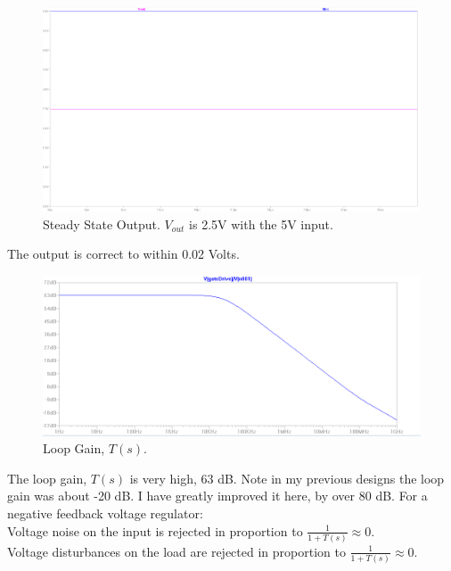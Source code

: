 \documentclass[10pt]{amsart}
\begin{document}
\begin{figure}[h]
	\begin{center}
		\includegraphics[width=7in]{Media/ss.png}
	\end{center}
	\caption{Steady State Output. $V_{out}$ is 2.5V with the 5V input.}
	\label{fig:pidfb}
\end{figure}

The output is correct to within 0.02 Volts.

\newpage

\begin{figure}[h]
	\begin{center}
		\includegraphics[width=7in]{Media/lg.png}
	\end{center}
	\caption{Loop Gain, $T(s)$.}
	\label{fig:pidfb}
\end{figure}

The loop gain, $T(s)$ is very high, 63 dB. Note in my previous designs the loop gain was about -20 dB. I have greatly improved it here, by over 80 dB. For a negative feedback voltage regulator:\\

Voltage noise on the input is rejected in proportion to $\frac{1}{1 + T(s)} \approx 0$. \\

Voltage disturbances on the load are rejected in proportion to $\frac{1}{1 + T(s)} \approx 0$. \\
\end{document}
